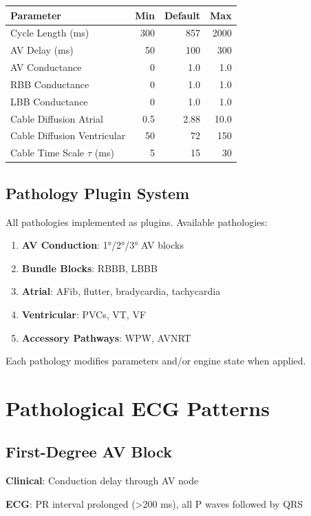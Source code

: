 \documentclass[12pt,a4paper]{article}
\begin{document}
\begin{tabular}{|l|r|r|r|}
\hline
\textbf{Parameter} & \textbf{Min} & \textbf{Default} & \textbf{Max} \\
\hline
Cycle Length (ms) & 300 & 857 & 2000 \\
AV Delay (ms) & 50 & 100 & 300 \\
AV Conductance & 0 & 1.0 & 1.0 \\
RBB Conductance & 0 & 1.0 & 1.0 \\
LBB Conductance & 0 & 1.0 & 1.0 \\
Cable Diffusion Atrial & 0.5 & 2.88 & 10.0 \\
Cable Diffusion Ventricular & 50 & 72 & 150 \\
Cable Time Scale $\tau$ (ms) & 5 & 15 & 30 \\
\hline
\end{tabular}

\subsection{Pathology Plugin System}

All pathologies implemented as plugins. Available pathologies:

\begin{enumerate}
    \item \textbf{AV Conduction}: 1°/2°/3° AV blocks
    \item \textbf{Bundle Blocks}: RBBB, LBBB
    \item \textbf{Atrial}: AFib, flutter, bradycardia, tachycardia
    \item \textbf{Ventricular}: PVCs, VT, VF
    \item \textbf{Accessory Pathways}: WPW, AVNRT
\end{enumerate}

Each pathology modifies parameters and/or engine state when applied.

\section{Pathological ECG Patterns}

\subsection{First-Degree AV Block}

\textbf{Clinical}: Conduction delay through AV node

\textbf{ECG}: PR interval prolonged (>200 ms), all P waves followed by QRS
\end{document}
